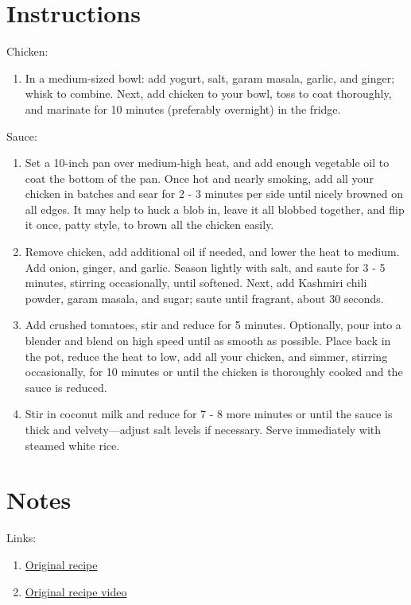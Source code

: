 \documentclass[11pt]{article}
\begin{document}
    \section*{Instructions}
    Chicken:
    \begin{enumerate}
        \item In a medium-sized bowl: add yogurt, salt, garam masala, garlic, and ginger; whisk to combine. Next, add chicken to your bowl, toss to coat thoroughly, and marinate for 10 minutes (preferably overnight) in the fridge.
    \end{enumerate}
    Sauce:
    \begin{enumerate}
        \item Set a 10-inch pan over medium-high heat, and add enough vegetable oil to coat the bottom of the pan. Once hot and nearly smoking, add all your chicken in batches and sear for 2 - 3 minutes per side until nicely browned on all edges. It may help to huck a blob in, leave it all blobbed together, and flip it once, patty style, to brown all the chicken easily.
        \item Remove chicken, add additional oil if needed, and lower the heat to medium. Add onion, ginger, and garlic. Season lightly with salt, and saute for 3 - 5 minutes, stirring occasionally, until softened. Next, add Kashmiri chili powder, garam masala, and sugar; saute until fragrant, about 30 seconds.
        \item Add crushed tomatoes, stir and reduce for 5 minutes. Optionally, pour into a blender and blend on high speed until as smooth as possible. Place back in the pot, reduce the heat to low, add all your chicken, and simmer, stirring occasionally, for 10 minutes or until the chicken is thoroughly cooked and the sauce is reduced.
        \item Stir in coconut milk and reduce for 7 - 8 more minutes or until the sauce is thick and velvety—adjust salt levels if necessary. Serve immediately with steamed white rice.
    \end{enumerate}

    \section*{Notes}
    Links:
    \begin{enumerate}
        \item \href{https://www.joshuaweissman.com/post/2-chicken-tikka-masala-but-cheaper}{Original recipe}
        \item\href{https://youtu.be/O5l1SMavklI}{Original recipe video}
    \end{enumerate}
\end{document}
